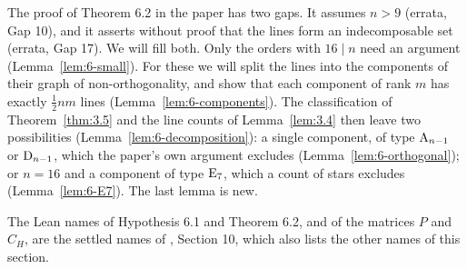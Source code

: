 The proof of Theorem 6.2 in the paper has two gaps. It assumes $n>9$ (errata, Gap 10), and it
asserts without proof that the lines form an indecomposable set (errata, Gap 17). We will fill
both. Only the orders with $16\mid n$ need an argument (Lemma~\ref{lem:6-small}). For these we
will split the lines into the components of their graph of non-orthogonality, and show that
each component of rank $m$ has exactly $\frac12nm$ lines (Lemma~\ref{lem:6-components}). The
classification of Theorem~\ref{thm:3.5} and the line counts of Lemma~\ref{lem:3.4} then leave
two possibilities (Lemma~\ref{lem:6-decomposition}): a single component, of type
$\mathrm{A}_{n-1}$ or $\mathrm{D}_{n-1}$, which the paper's own argument excludes
(Lemma~\ref{lem:6-orthogonal}); or $n=16$ and a component of type $\mathrm{E}_7$, which a count of
stars excludes (Lemma~\ref{lem:6-E7}). The last lemma is new.

The Lean names of Hypothesis 6.1 and Theorem 6.2, and of the matrices $P$ and $C_H$, are the
settled names of , Section 10, which also lists the other names of this
section.


